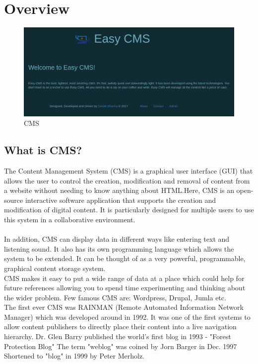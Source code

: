 \section{Overview}
\begin{figure}[!ht]
\centering
\includegraphics[scale=0.41]{input/images/easy1.png}                   
\caption{CMS}
\hspace{-1.5em}
\end{figure}
\subsection{What is CMS?}
The Content Management System (CMS) is a graphical user interface (GUI) that allows the user to control the creation, modification and removal of content from a website without needing to know anything about HTML.Here, CMS is an open-source interactive software application that supports the creation and modification of digital content. It is particularly designed for multiple users to use this system in a collaborative environment. \\\\
In addition, CMS can display data in different ways like entering text and listening sound. It
also has its own programming language which allows the system to be extended. It can
be thought of as a very powerful, programmable, graphical content storage system.\\
CMS makes it easy to put a wide range of data at a place which could help for future references allowing you to spend time experimenting and thinking about the wider problem.
Few famous CMS are: Wordpress, Drupal, Jumla etc. \\
The first ever CMS was RAINMAN (Remote Automated Information Network Manager) which was developed around in 1992. It was one of the first systems to allow content publishers to directly place their content into a live navigation hierarchy.
Dr. Glen Barry published the world's first blog in 1993 - "Forest Protection Blog" The term "weblog" was coined by Jorn Barger in Dec. 1997 Shortened to "blog" in 1999 by Peter Merholz.
